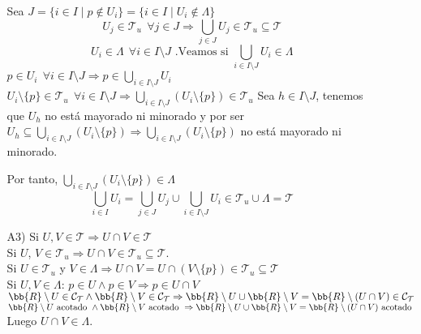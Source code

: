 \documentclass[12pt]{article}
\newcounter{ejercicio}[section] %
\newcounter{ejercicio}
\begin{document}
\begin{ejercicio}[3 puntos]
\begin{enumerate}[label=(\alph*)]
\begin{enumerate}
                        \noindent
                        Sea $J = \{i \in I \mid p \notin U_i\} = \{i \in I \mid U_i \notin \Lambda\}$
                        $$U_j \in \mathcal{T}_u ~~\forall j \in J \Rightarrow \bigcup_{j \in J} U_j \in \mathcal{T}_u \subseteq \mathcal{T}$$
                        $$U_i \in \Lambda~~\forall i \in I \setminus J \mbox{ .Veamos si } \bigcup_{i \in I\setminus J} U_i \in \Lambda$$
                        $p \in U_i~~\forall i \in I \setminus J \Rightarrow p \in \displaystyle \bigcup_{i \in I \setminus J} U_i$\newline
                        $U_i \setminus \{p\} \in \mathcal{T}_u ~~ \forall i \in I \setminus J \Rightarrow \displaystyle \bigcup_{i \in I \setminus J } (U_i \setminus \{p\}) \in \mathcal{T}_u$\newline
                        Sea $h \in I \setminus J$, tenemos que $U_h$ no está mayorado ni minorado y por ser $U_h \subseteq \displaystyle \bigcup_{i \in I \setminus J} (U_i \setminus \{p\}) \Rightarrow \displaystyle \bigcup_{i \in I \setminus J} (U_i \setminus \{p\})$ no está mayorado ni minorado.
                        
                        \noindent
                        Por tanto, $ \displaystyle \bigcup_{i \in I \setminus J} (U_i \setminus \{p\}) \in \Lambda$ 
                        $$\displaystyle \bigcup_{i \in I} U_i = \bigcup_{j \in J}U_j \cup \bigcup_{i \in I \setminus J} U_i \in \mathcal{T}_u \cup \Lambda = \mathcal{T}$$

                    \item[A3)] Si $U, V \in \mathcal{T} \Rightarrow U \cap V \in \mathcal{T}$\\

                        \noindent
                        Si $U$, $V \in \mathcal{T}_u \Rightarrow U \cap V \in \mathcal{T}_u \subseteq \mathcal{T}$.\\

                        \noindent
                        Si $U \in \mathcal{T}_u$ y $V \in \Lambda \Rightarrow U \cap V = U \cap (V \setminus \{p\}) \in \mathcal{T}_u \subseteq \mathcal{T}$\\

                        \noindent
                        Si $U, V \in \Lambda$:\newline
                        $p \in U \land p \in V \Rightarrow p \in U \cap V$\newline
                        $\bb{R}\setminus U \in \mathcal{C_T} \land \bb{R}\setminus V \in \mathcal{C_T} \Rightarrow \bb{R}\setminus U \cup \bb{R}\setminus V = \bb{R}\setminus (U \cap V)\in \mathcal{C_T}$\newline
                        $\bb{R}\setminus U \mbox{ acotado } \land \bb{R}\setminus V \mbox{ acotado } \Rightarrow \bb{R}\setminus U \cup \bb{R}\setminus V = \bb{R}\setminus (U \cap V)\mbox{ acotado }$\newline
                        Luego $U \cap V \in \Lambda$.
                \end{enumerate}


\end{enumerate}
\end{ejercicio}
\end{document}

